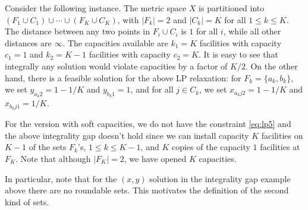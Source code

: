 \begin{remark} \label{rem:ig}
Consider the following instance. The metric space $X$ is partitioned into $(F_1\cup C_1) \cup \cdots \cup (F_K\cup C_K)$, with $|F_k| = 2$ and $|C_k| = K$ for all $1\le k\le K$.
The distance between any two points in $F_i\cup C_i$ is $1$ for all $i$, while all other distances are $\infty$. The capacities available are $k_1 = K$ facilities with capacity $c_1 = 1$ and
$k_2= K-1$ facilities with capacity $c_2 = K$. It is easy to see that integrally any solution would violate capacities by a factor of $K/2$.
On the other hand, there is a feasible solution for the above LP relaxation: for $F_k = \{a_k,b_k\}$, we set $y_{a_k2} = 1-1/K$ and $y_{b_k1} = 1$, and for all $j\in C_k$, we set $x_{a_kj2} = 1-1/K$ and $x_{b_kj1} = 1/K$.


 For the version with soft capacities, we do not have the constraint \eqref{eq:lp5} and the above integrality gap doesn't hold since we can install capacity $K$ facilities on $K-1$ of the sets $F_k$'s, $1\leq k\leq K-1$, and $K$ copies of the capacity $1$ facilities at $F_K$. Note that although $|F_K| = 2$, we have opened $K$ capacities.
\end{remark}

In particular, note that for the $(x,y)$ solution in the integrality gap example above there are no roundable sets. This motivates the definition of the second kind of sets.

